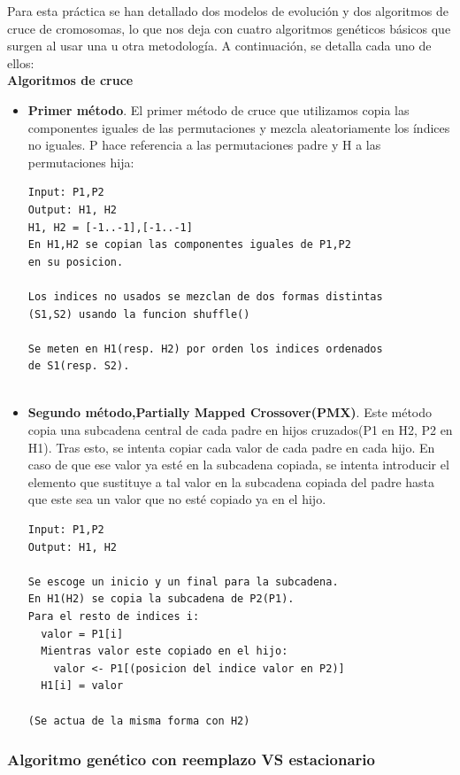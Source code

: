 Para esta práctica se han detallado dos modelos de evolución y dos algoritmos de cruce de cromosomas, lo que nos deja con cuatro algoritmos genéticos básicos que surgen al usar una u otra metodología. A continuación, se detalla cada uno de ellos:\\

\textbf{Algoritmos de cruce}
\begin{itemize}
	\item \textbf{Primer método}. El primer método de cruce que utilizamos copia las componentes iguales de las permutaciones y  mezcla aleatoriamente los índices no iguales. P hace referencia a las permutaciones padre y H a las permutaciones hija:\\
	
	\begin{lstlisting}
Input: P1,P2
Output: H1, H2
H1, H2 = [-1..-1],[-1..-1]
En H1,H2 se copian las componentes iguales de P1,P2
en su posicion.

Los indices no usados se mezclan de dos formas distintas
(S1,S2) usando la funcion shuffle()

Se meten en H1(resp. H2) por orden los indices ordenados
de S1(resp. S2).
	
	\end{lstlisting}
	
	\item \textbf{Segundo método,Partially Mapped Crossover(PMX)}. Este método copia una subcadena central de cada padre en hijos cruzados(P1 en H2, P2 en H1). Tras esto, se intenta copiar cada valor de cada padre en cada hijo. En caso de que ese valor ya esté en la subcadena copiada, se intenta introducir el elemento que sustituye a tal valor en la subcadena copiada del padre hasta que este sea un valor que no esté copiado ya en el hijo.\\
	
	\begin{lstlisting}
Input: P1,P2
Output: H1, H2

Se escoge un inicio y un final para la subcadena.
En H1(H2) se copia la subcadena de P2(P1).
Para el resto de indices i:
  valor = P1[i]
  Mientras valor este copiado en el hijo:
    valor <- P1[(posicion del indice valor en P2)]
  H1[i] = valor
  
(Se actua de la misma forma con H2)
	\end{lstlisting}
	
	
\end{itemize}

\subsubsection{Algoritmo genético con reemplazo VS estacionario}

